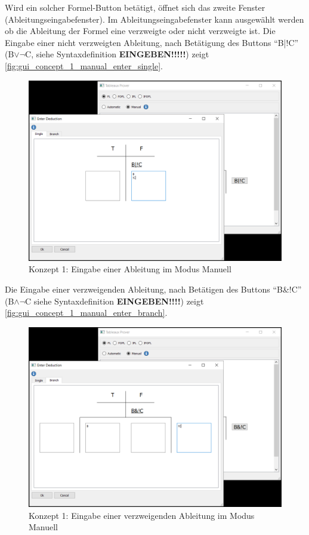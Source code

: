 Wird ein solcher Formel-Button betätigt, öffnet sich das zweite Fenster (Ableitungseingabefenster). Im Ableitungseingabefenster kann ausgewählt werden ob die Ableitung der Formel eine verzweigte oder nicht verzweigte ist. Die Eingabe einer nicht verzweigten Ableitung, nach Betätigung des Buttons \enquote{B|!C} (B$\vee\neg$C, siehe Syntaxdefinition \textbf{EINGEBEN!!!!!}) zeigt \autoref{fig:gui_concept_1_manual_enter_single}.

\begin{figure}[h]
\begin{center}
\includegraphics[scale=0.7]{images/gui_concept_1_manual_enter_single.png}
\caption{Konzept 1: Eingabe einer Ableitung im Modus Manuell}
\label{fig:gui_concept_1_manual_enter_single}
\end{center}
\end{figure}

Die Eingabe einer verzweigenden Ableitung, nach Betätigen des Buttons \enquote{B\&!C} (B$\wedge\neg$C siehe Syntaxdefinition \textbf{EINGEBEN!!!!}) zeigt \autoref{fig:gui_concept_1_manual_enter_branch}.

\begin{figure}[h]
\begin{center}
\includegraphics[scale=0.7]{images/gui_concept_1_manual_enter_branch.png}
\caption{Konzept 1: Eingabe einer verzweigenden Ableitung im Modus Manuell}
\label{fig:gui_concept_1_manual_enter_branch}
\end{center}
\end{figure}

